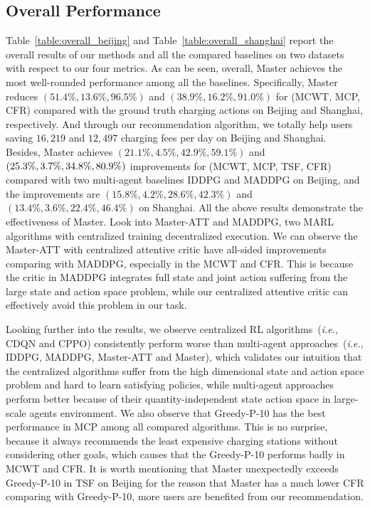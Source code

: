 \documentclass[sigconf]{acmart}
\newcommand{\beijing}{{\sc Beijing}\xspace}
\newcommand{\shanghai}{{\sc Shanghai}\xspace}
\newcommand{\stddpg}{{\sc Master}\xspace}
\newcommand{\ie}{\emph{i.e.},\xspace}
\newcommand\tabref[1]{Table~\ref{#1}}
\begin{document}
\subsection{Overall Performance}
\tabref{table:overall_beijing} and \tabref{table:overall_shanghai} report the overall results of our methods and all the compared baselines on two datasets with respect to our four metrics.
As can be seen, overall, \stddpg achieves the most well-rounded performance among all the baselines.
Specifically, \stddpg reduces $(51.4\%, 13.6\%, 96.5\%)$ and $(38.9\%, 16.2\%, 91.0\%)$ for (MCWT, MCP, CFR) compared with the ground truth charging actions on \beijing and \shanghai, respectively. And through our recommendation algorithm, we totally help users saving $16,219$ and $12,497$ charging fees per day on \beijing and \shanghai.
Besides, \stddpg achieves $(21.1\%, 4.5\%, 42.9\%, 59.1\%)$ and $(25.3\%,\\ 3.7\%, 34.8\%, 80.9\%)$ improvements for (MCWT, MCP, TSF, CFR) compared with two multi-agent baselines IDDPG and MADDPG on \beijing , and the improvements are $(15.8\%, 4.2\%, 28.6\%, 42.3\%)$ and $(13.4\%, 3.6\%, 22.4\%, 46.4\%)$ on \shanghai. 
All the above results demonstrate the effectiveness of \stddpg.
Look into \stddpg-ATT and MADDPG, two MARL algorithms with centralized training decentralized execution. We can observe the \stddpg-ATT with centralized attentive critic have all-sided improvements comparing with MADDPG, especially in the MCWT and CFR. This is because the critic in MADDPG integrates full state and joint action suffering from the large state and action space problem, while our centralized attentive critic can effectively avoid this problem in our task.

Looking further into the results, we observe centralized RL algorithms~(\ie CDQN and CPPO) consistently perform worse than multi-agent approaches~(\ie IDDPG, MADDPG, \stddpg-ATT and \stddpg), which validates our intuition that the centralized algorithms suffer from the high dimensional state and action space problem and hard to learn satisfying policies, while multi-agent approaches perform better because of their quantity-independent state action space in large-scale agents environment. 
We also observe that Greedy-P-10 has the best performance in MCP among all compared algorithms. This is no surprise, because it always recommends the least expensive charging stations without considering other goals, which causes that the Greedy-P-10 performs badly in MCWT and CFR. It is worth mentioning that \stddpg unexpectedly exceeds Greedy-P-10 in TSF on \beijing for the reason that \stddpg has a much lower CFR comparing with Greedy-P-10, more users are benefited from our recommendation.
\end{document}
